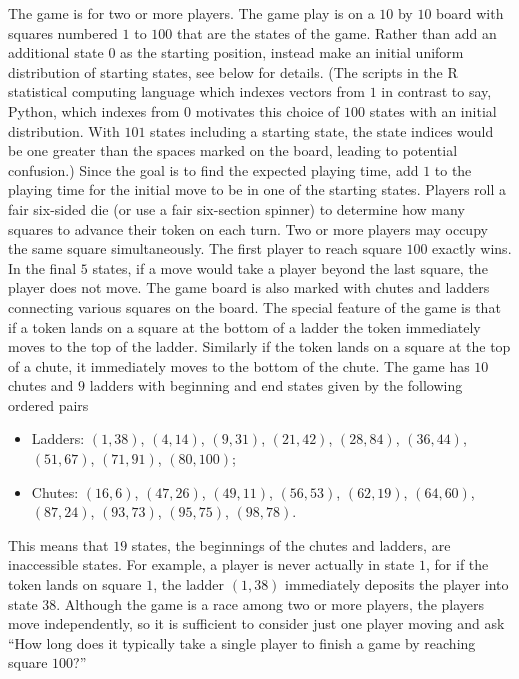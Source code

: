 \documentclass[12pt]{article}
\begin{document}
The game is for two or more players.  The game play is on a \( 10 \) by \(
10 \) board with squares numbered \( 1 \) to \( 100 \) that are the
states of the game.  Rather than add an additional state \( 0 \) as the
starting position, instead make an initial uniform distribution of
starting states, see below for details.  (The scripts in the R
statistical computing language which indexes vectors from \( 1 \) in
contrast to say, Python, which indexes from \( 0 \) motivates this
choice of \( 100 \) states with an initial distribution.  With \( 101 \)
states including a starting state, the state indices would be one
greater than the spaces marked on the board, leading to potential
confusion.) Since the goal is to find the expected playing time, add \(
1 \) to the playing time for the initial move to be in one of the
starting states.  Players roll a fair six-sided die (or use a fair
six-section spinner) to determine how many squares to advance their
token on each turn.  Two or more players may occupy the same square
simultaneously.  The first player to reach square \( 100 \) exactly
wins.  In the final \( 5 \) states, if a move would take a player beyond
the last square, the player does not move.  The game board is also
marked with chutes and ladders connecting various squares on the board.
The special feature of the game is that if a token lands on a square at
the bottom of a ladder the token immediately moves to the top of the
ladder.  Similarly if the token lands on a square at the top of a chute,
it immediately moves to the bottom of the chute.  The game has \( 10 \)
chutes and \( 9 \) ladders with beginning and end states given by the
following ordered pairs
\begin{itemize}
    \item
        Ladders:  \( (1,38) \), \( (4,14) \), \( (9,31) \), \( (21,42) \),
        \( (28,84) \), \( (36, 44) \), \( (51,67) \), \( (71,91) \), \(
        (80, 100) \);
    \item
        Chutes:  \( (16,6) \), \( (47,26) \), \( (49,11) \), \( (56,53) \),
        \( (62,19) \), \( (64,60) \), \( (87,24) \), \( (93,73) \), \( (95,75)
        \), \( (98,78) \).
\end{itemize}
This means that \( 19 \) states, the beginnings of the chutes and
ladders, are inaccessible states.  For example, a player is never
actually in state \( 1 \), for if the token lands on square \( 1 \), the
ladder \( (1,38) \) immediately deposits the player into state \( 38 \).
Although the game is a race among two or more players, the players move
independently, so it is sufficient to consider just one player moving
and ask ``How long does it typically take a single player to finish a
game by reaching square \( 100 \)?''
\end{document}
